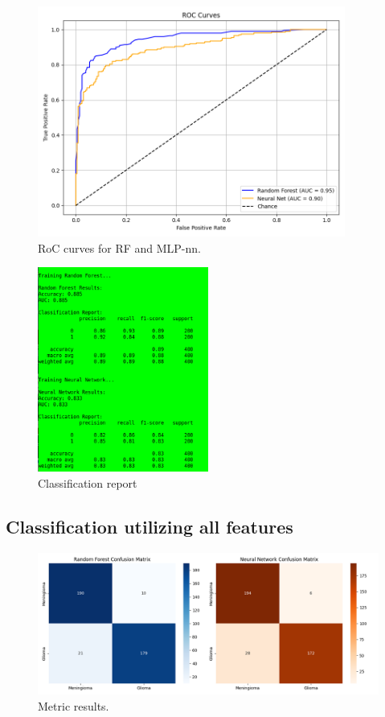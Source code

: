 \documentclass[11pt,a4paper]{report}
\begin{document}
		\begin{figure}[H]
			\centering
			\includegraphics[width=0.9\textwidth]{images/freq_roc.png}
			\caption{RoC curves for RF and MLP-nn.}
			\label{fig1:}
		\end{figure}		

		\begin{figure}[H]
			\centering
			\includegraphics[width=0.5\textwidth]{images/report_freq.png}
			\caption{Classification report}
			\label{fig1:}
		\end{figure}		


	\subsection{Classification utilizing all features}
		\begin{figure}[H]
			\centering
			\includegraphics[width=1.1\textwidth]{images/Metrics_all_features.png}
			\caption{Metric results.}
			\label{fig1:}
		\end{figure}		
\end{document}
